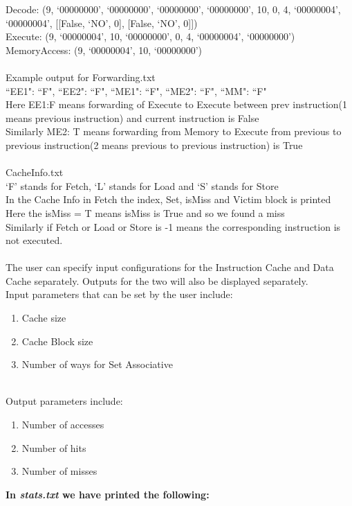 \documentclass{article}
\begin{document}
Decode: (9, `00000000', `00000000', `00000000', `00000000', 10, 0, 4, `00000004', `00000004', [[False, `NO', 0], [False, `NO', 0]]) \\
Execute: (9, `00000004', 10, `00000000', 0, 4, `00000004', `00000000') \\
MemoryAccess: (9, `00000004', 10, `00000000') \\\\
Example output for Forwarding.txt\\
{``EE1": ``F", ``EE2": ``F", ``ME1": ``F", ``ME2": ``F", ``MM": ``F"}\\
Here EE1:F means forwarding of Execute to Execute between prev instruction(1 means previous instruction) and current instruction is False\\
Similarly ME2: T means forwarding from Memory to Execute from previous to previous instruction(2 means previous to previous instruction) is True\\\\
CacheInfo.txt\\
`F' stands for Fetch, `L' stands for Load and `S' stands for Store\\
In the Cache Info in Fetch the index, Set, isMiss and Victim block is printed\\
Here the isMiss = T means isMiss is True and so we found a miss\\
Similarly if Fetch or Load or Store is -1 means the corresponding instruction is not executed.\\
\\The user can specify input configurations for the Instruction Cache and Data Cache separately. Outputs for the two will also be displayed separately.\\
Input parameters that can be set by the user include:
\begin{enumerate}
    \item Cache size
    \item Cache Block size
    \item Number of ways for Set Associative
\end{enumerate}
\\Output parameters include:
\begin{enumerate}
    \item Number of accesses
    \item Number of hits
    \item Number of misses
\end{enumerate}

\newpage
\Large
\textbf{In \textsl{stats.txt} we have printed the following:}
\end{document}
